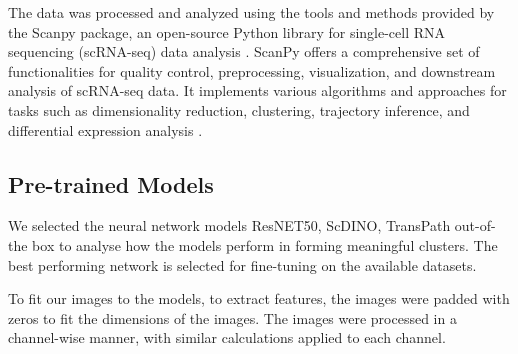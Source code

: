 \documentclass[12pt,a4paper]{article}
\begin{document}
The data was processed and analyzed using the tools and methods provided by the Scanpy package, an open-source Python library for single-cell RNA sequencing (scRNA-seq) data analysis \cite{wolf_angerer_theis_2018}. ScanPy offers a comprehensive set of functionalities for quality control, preprocessing, visualization, and downstream analysis of scRNA-seq data. It implements various algorithms and approaches for tasks such as dimensionality reduction, clustering, trajectory inference, and differential expression analysis \cite{wolf_angerer_theis_2018}.

\subsection{Pre-trained Models}
We selected the neural network models ResNET50, ScDINO, TransPath out-of-the box to analyse how the models perform in forming meaningful clusters. The best performing network is selected for fine-tuning on the available datasets.

To fit our images to the models, to extract features, the images were padded with zeros to fit the dimensions of the images. The images were processed in a channel-wise manner, with similar calculations applied to each channel.
\end{document}
